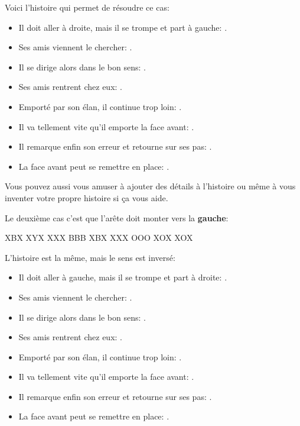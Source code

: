 Voici l'\og{}histoire\fg{} qui permet de résoudre ce cas:
\begin{itemize}
	\item Il doit aller à droite, mais il se trompe et part à gauche: .
	\item Ses amis viennent le chercher: .
	\item Il se dirige alors dans le bon sens: .
	\item Ses amis rentrent chez eux: .
	\item Emporté par son élan, il continue trop loin: .
	\item Il va tellement vite qu'il emporte la face avant: .
	\item Il remarque enfin son erreur et retourne sur ses pas: .
	\item La face avant peut se remettre en place: .
\end{itemize}

Vous pouvez aussi vous amuser à ajouter des détails à l'histoire ou même à vous inventer votre propre histoire si ça vous aide. 

\newpage
Le deuxième cas c'est que l'arête doit \og{}monter\fg{} vers la \textbf{gauche}:
\smallskip

\begin{center}
	\RubikFaceDown%
	{X}{B}{X}%
	{X}{Y}{X}%
	{X}{X}{X}
	\RubikFaceLeft%
	{B}{B}{B}%
	{X}{B}{X}%
	{X}{X}{X}
	\RubikFaceFront%
	{O}{O}{O}%
	{X}{O}{X}%
	{X}{O}{X}
\end{center}
\smallskip

L'histoire est la même, mais le sens est inversé:
\begin{itemize}
	\item Il doit aller à gauche, mais il se trompe et part à droite: .
	\item Ses amis viennent le chercher: .
	\item Il se dirige alors dans le bon sens: .
	\item Ses amis rentrent chez eux: .
	\item Emporté par son élan, il continue trop loin: .
	\item Il va tellement vite qu'il emporte la face avant: .
	\item Il remarque enfin son erreur et retourne sur ses pas: .
	\item La face avant peut se remettre en place: .
\end{itemize}

